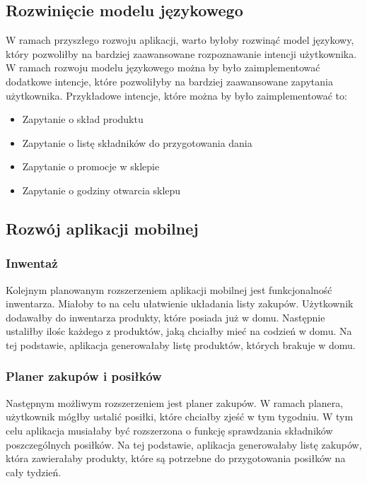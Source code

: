 \subsection{Rozwinięcie modelu językowego}
W ramach przyszłego rozwoju aplikacji, warto byłoby rozwinąć model językowy, który pozwoliłby na bardziej zaawansowane rozpoznawanie intencji użytkownika. W ramach rozwoju modelu językowego można by było zaimplementować dodatkowe intencje, które pozwoliłyby na bardziej zaawansowane zapytania użytkownika. Przykładowe intencje, które można by było zaimplementować to:
\begin{itemize}
    \item Zapytanie o skład produktu
    \item Zapytanie o listę składników do przygotowania dania
    \item Zapytanie o promocje w sklepie
    \item Zapytanie o godziny otwarcia sklepu
\end{itemize}


\subsection{Rozwój aplikacji mobilnej}

\subsubsection{Inwentaż}

Kolejnym planowanym rozszerzeniem aplikacji mobilnej jest funkcjonalność inwentarza. Miałoby to na celu ułatwienie układania listy zakupów. Użytkownik dodawałby do inwentarza produkty, które posiada już w domu. Następnie ustaliłby ilośc każdego z produktów, jaką chciałby mieć na codzień w domu.
Na tej podstawie, aplikacja generowałaby listę produktów, których brakuje w domu. 

\subsubsection{Planer zakupów i posiłków}

Następnym możliwym rozszerzeniem jest planer zakupów. W ramach planera, użytkownik mógłby ustalić posiłki, które chciałby zjeść w tym tygodniu. W tym celu aplikacja musiałaby być rozszerzona o funkcję sprawdzania składników poszczególnych posiłków. Na tej podstawie, aplikacja generowałaby listę zakupów, która zawierałaby produkty, które są potrzebne do przygotowania posiłków na cały tydzień.

